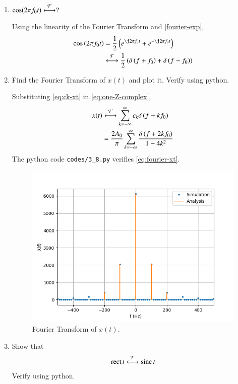 \documentclass[journal,12pt,twocolumn]{IEEEtran}
\renewcommand\thesection{\arabic{section}}
\begin{document}
\begin{enumerate}[label=\thesection.\arabic*
,ref=\thesection.\theenumi]
\solution Suppose $g(t)\system{F}G(f)$. Then,
\begin{align}
    g(t)e^{\j2\pi f_0t}&\system{F}\int_{-\infty}^{\infty}
                       g(t)e^{-\j2\pi\brak{f-f_0}t}\, dt \\
                       &=F(f-f_0)
                       \label{eq:f-shift}
\end{align}
Using \eqref{eq:duality} in \eqref{eq:fourier-delta}, $1\system{F}\delta(-f)$.
Hence, applying \eqref{eq:f-shift},
\begin{align}
    e^{-\j2\pi f_0t}\system{F}\delta(-(f+f_0)) = \delta(f+f_0)
    \label{eq:fourier-exp}
\end{align}
\item $\cos(2\pi f_0t)\overset{\mathcal{F}}{ \longleftrightarrow}?$

\solution Using the linearity of the Fourier 
Transform and \eqref{fourier-exp},
\begin{align}
    \cos\brak{2\pi f_0t} &= \frac{1}{2}
                         \brak{e^{\j2\pi f_0t} + e^{-\j2\pi f_0t}} \\
                         &\system{F}\frac{1}{2}\brak{\delta\brak{f+f_0} + \delta\brak{f-f_0}}
\end{align}
\item Find the Fourier Transform of $x(t)$ and plot it. Verify using python.

\solution Substituting \eqref{eq:ck-xt} in \eqref{eq:one-Z-complex},
\begin{align}
    x(t)&\overset{\mathcal{F}}{ \longleftrightarrow}\sum_{k=-\infty}^{\infty}c_k\delta\left(f+kf_0\right) \\
        &=\frac{2A_0}{\pi}\sum_{k=-\infty}^{\infty}\frac{\delta\left(f+2kf_0\right)}{1-4k^2}
        \label{eq:fourier-xt}
\end{align}
The python code \texttt{codes/3\_8.py} verifies \eqref{eq:fourier-xt}.
\begin{figure}[!ht]
    \includegraphics[width=\columnwidth]{figs/3_8.png}
    \caption{Fourier Transform of $x(t)$.}
    \label{eq:fig-fourier-xt}
\end{figure}
\item Show that
\begin{align}
    \mathop{\mathrm{rect}}{t} \overset{\mathcal{F}}{ \longleftrightarrow} \mathop{\mathrm{sinc}}{t}
\end{align}
Verify using python.


\end{enumerate}
\end{document}

